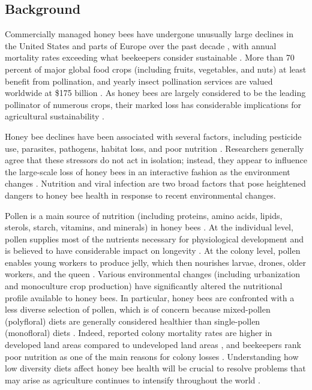 \documentclass{bmcart}
\begin{document}
\begin{linenumbers} %
\begin{doublespacing} %

\section*{Background}

Commercially managed honey bees have undergone unusually large declines in the United States and parts of Europe over the past decade \cite{ccd1, ccd2, ccd3}, with annual mortality rates exceeding what beekeepers consider sustainable \cite{ccd5, ccd6}. More than 70 percent of major global food crops (including fruits, vegetables, and nuts) at least benefit from pollination, and yearly insect pollination services are valued worldwide at \$175 billion \cite{ccd7}. As honey bees are largely considered to be the leading pollinator of numerous crops, their marked loss has considerable implications for agricultural sustainability \cite{ccd4}.

Honey bee declines have been associated with several factors, including pesticide use, parasites, pathogens, habitat loss, and poor nutrition \cite{factors, factors2}. Researchers generally agree that these stressors do not act in isolation; instead, they appear to influence the large-scale loss of honey bees in an interactive fashion as the environment changes \cite{interacting}. Nutrition and viral infection are two broad factors that pose heightened dangers to honey bee health in response to recent environmental changes.

Pollen is a main source of nutrition (including proteins, amino acids, lipids, sterols, starch, vitamins, and minerals) in honey bees \cite{source, source2}. At the individual level, pollen supplies most of the nutrients necessary for physiological development \cite{brodschneider} and is believed to have considerable impact on longevity \cite{longevity}. At the colony level, pollen enables young workers to produce jelly, which then nourishes larvae, drones, older workers, and the queen \cite{jelly, jelly2}. Various environmental changes (including urbanization and monoculture crop production) have significantly altered the nutritional profile available to honey bees. In particular, honey bees are confronted with a less diverse selection of pollen, which is of concern because mixed-pollen (polyfloral) diets are generally considered healthier than single-pollen (monofloral) diets \cite{diverse, diverse2, alaux}. Indeed, reported colony mortality rates are higher in developed land areas compared to undeveloped land areas \cite{undeveloped}, and beekeepers rank poor nutrition as one of the main reasons for colony losses \cite{bkLoss}. Understanding how low diversity diets affect honey bee health will be crucial to resolve problems that may arise as agriculture continues to intensify throughout the world \cite{ag, ag2}.


\end{doublespacing}
\end{linenumbers}
\end{document}
